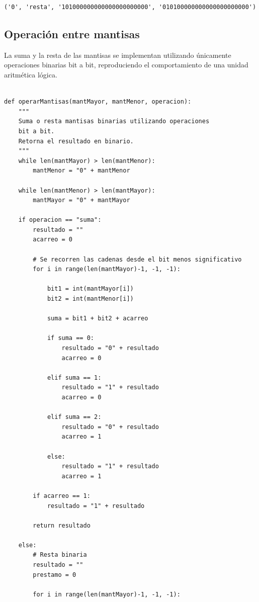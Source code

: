 \documentclass[11pt]{article}
\begin{document}
\label{org9e67b50}
\begin{verbatim}
('0', 'resta', '101000000000000000000000', '010100000000000000000000')
\end{verbatim}
\subsection{Operación entre mantisas}
\label{sec:org48fc35d}

La suma y la resta de las mantisas se implementan utilizando únicamente
operaciones binarias bit a bit, reproduciendo el comportamiento de una
unidad aritmética lógica.

\begin{verbatim}

def operarMantisas(mantMayor, mantMenor, operacion):
    """
    Suma o resta mantisas binarias utilizando operaciones
    bit a bit.
    Retorna el resultado en binario.
    """
    while len(mantMayor) > len(mantMenor):
        mantMenor = "0" + mantMenor

    while len(mantMenor) > len(mantMayor):
        mantMayor = "0" + mantMayor

    if operacion == "suma":
        resultado = ""
        acarreo = 0

        # Se recorren las cadenas desde el bit menos significativo
        for i in range(len(mantMayor)-1, -1, -1):

            bit1 = int(mantMayor[i])
            bit2 = int(mantMenor[i])

            suma = bit1 + bit2 + acarreo

            if suma == 0:
                resultado = "0" + resultado
                acarreo = 0

            elif suma == 1:
                resultado = "1" + resultado
                acarreo = 0

            elif suma == 2:
                resultado = "0" + resultado
                acarreo = 1

            else:
                resultado = "1" + resultado
                acarreo = 1

        if acarreo == 1:
            resultado = "1" + resultado

        return resultado

    else:
        # Resta binaria
        resultado = ""
        prestamo = 0

        for i in range(len(mantMayor)-1, -1, -1):


\end{verbatim}
\end{document}
